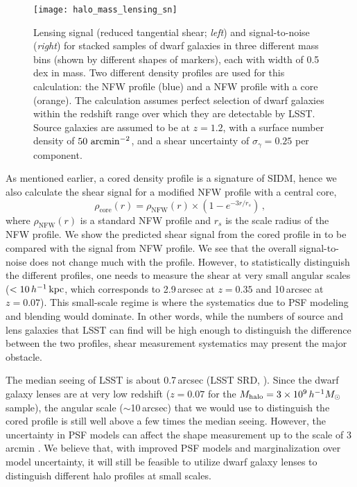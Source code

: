 \begin{figure}
\centering
\texttt{[image: halo\_mass\_lensing\_sn]}
\caption{
\label{fig:dwarf_sn} Lensing signal (reduced tangential shear; \textit{left}) and signal-to-noise (\textit{right}) for stacked samples of dwarf galaxies in three different mass bins (shown by different shapes of markers), each with width of 0.5 dex in mass. Two different density profiles are used for this calculation: the NFW profile (blue) and a NFW profile with a core (orange). 
The calculation assumes perfect selection of dwarf galaxies within the redshift range over which they are detectable by LSST. 
Source galaxies are assumed to be at $z=1.2$, with a surface number density of $50\,\mathrm{\,arcmin}^{-2}$, and a shear uncertainty of $\sigma_\gamma = 0.25$ per component.}
\end{figure}

As mentioned earlier, a cored density profile is a signature of SIDM, hence we also calculate the shear signal for a modified NFW profile with a central core,
\begin{equation}
\rho_\text{core}(r) = \rho_\text{NFW}(r) \times (1 -  e^{-3r/r_s})\,,
\end{equation}
where $\rho_\text{NFW}(r)$ is a standard NFW profile and $r_s$ is the scale radius of the NFW profile. 
We show the predicted shear signal from the cored profile in  to be compared with the signal from NFW profile. 
We see that the overall signal-to-noise does not change much with the profile.  
However, to statistically distinguish the different profiles, one needs to measure the shear at very small angular scales ($< 10\,h^{-1}\mathrm{\,kpc}$, which corresponds to 2.9\,arcsec at $z=0.35$ and 10\,arcsec at $z=0.07$). This small-scale regime is where the systematics due to PSF modeling and blending would dominate. 
In other words, while the numbers of source and lens galaxies that LSST can find will be high enough to distinguish the difference between the two profiles, shear measurement systematics may present the major obstacle. 

The median seeing of LSST is about 0.7\,arcsec (LSST SRD, \cite{LPM-17}). Since the dwarf galaxy lenses are at very low redshift ($z=0.07$ for the $M_\text{halo}=3\times10^9\,h^{-1}M_\odot$ sample), the angular scale ($\sim$10\,arcsec) that we would use to distinguish the cored profile is still well above a few times the median seeing. However, the uncertainty in PSF models can affect the shape measurement up to the scale of 3\,arcmin \citep{2012MNRAS.427.2572C}. We believe that, with improved PSF models and marginalization over model uncertainty, it will still be feasible to  utilize dwarf galaxy lenses to distinguish different halo profiles at small scales. 

